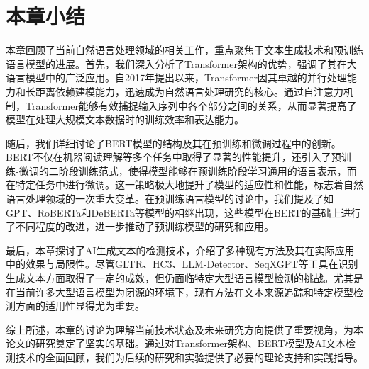 \section{本章小结}
\label{sec:rw-conclusion}

本章回顾了当前自然语言处理领域的相关工作，重点聚焦于文本生成技术和预训练语言模型的进展。首先，我们深入分析了Transformer架构的优势，强调了其在大语言模型中的广泛应用。自2017年提出以来，Transformer因其卓越的并行处理能力和长距离依赖建模能力，迅速成为自然语言处理研究的核心。通过自注意力机制，Transformer能够有效捕捉输入序列中各个部分之间的关系，从而显著提高了模型在处理大规模文本数据时的训练效率和表达能力。

随后，我们详细讨论了BERT模型的结构及其在预训练和微调过程中的创新。BERT不仅在机器阅读理解等多个任务中取得了显著的性能提升，还引入了预训练-微调的二阶段训练范式，使得模型能够在预训练阶段学习通用的语言表示，而在特定任务中进行微调。这一策略极大地提升了模型的适应性和性能，标志着自然语言处理领域的一次重大变革。在预训练语言模型的讨论中，我们提及了如GPT、RoBERTa和DeBERTa等模型的相继出现，这些模型在BERT的基础上进行了不同程度的改进，进一步推动了预训练模型的研究和应用。

最后，本章探讨了AI生成文本的检测技术，介绍了多种现有方法及其在实际应用中的效果与局限性。尽管GLTR、HC3、LLM-Detector、SeqXGPT等工具在识别生成文本方面取得了一定的成效，但仍面临特定大型语言模型检测的挑战。尤其是在当前许多大型语言模型为闭源的环境下，现有方法在文本来源追踪和特定模型检测方面的适用性显得尤为重要。

综上所述，本章的讨论为理解当前技术状态及未来研究方向提供了重要视角，为本论文的研究奠定了坚实的基础。通过对Transformer架构、BERT模型及AI文本检测技术的全面回顾，我们为后续的研究和实验提供了必要的理论支持和实践指导。